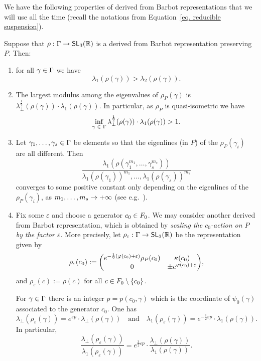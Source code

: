 \documentclass[AHL,Unicode,longabstracts]{cedram}
\DeclareMathOperator{\SL}{\mathsf{SL}}
\newcommand{\R}{\mathbb{R}}
\newcommand{\eps}{\varepsilon}
\renewcommand*{\to}{\mathchoice{\longrightarrow}{\rightarrow}{\rightarrow}{\rightarrow}}
\let\originalleft\left
\let\originalright\right
\renewcommand{\left}{\mathopen{}\mathclose\bgroup\originalleft}
\renewcommand{\right}{\aftergroup\egroup\originalright}
\let\oldin\in
\renewcommand{\in}{\mathchoice{\oldin}{\oldin}{\,\oldin\,}{\,\oldin\,}}
\begin{document}
We have the following properties of derived from Barbot representations that we will use all the time (recall the notations from Equation~\eqref{eq. reducible suspension}).

\begin{rema}\label{rem: scaling generator in P}
Suppose that $\rho:\Gamma\to\SL_3(\R)$ is a derived from Barbot representation preserving $P$. Then:
\begin{enumerate}
\item for all $\gamma\in\Gamma$ we have
\[
\lambda_{1}(\rho(\gamma))> \lambda_{2}(\rho(\gamma)).
\]
\item The largest modulus among the eigenvalues of $\rho_P(\gamma)$ is $\lambda_\perp^{\frac{1}{2}}(\rho(\gamma))\cdot\lambda_1(\rho(\gamma))$.
In particular, as $\rho_P$ is quasi-isometric we have
\[
\inf_{\gamma\in\Gamma}\lambda_\perp^{\frac{1}{2}}(\rho(\gamma))\cdot\lambda_1(\rho(\gamma))>1.
\]
\item Let $\gamma_1,\dots,\gamma_s\in\Gamma$ be elements so that the eigenlines (in $P$) of the $\rho_P(\gamma_i)$ are all different.
Then
\[
\frac{\lambda_1(\rho(\gamma_1^{m_1},\dots,\gamma_s^{m_s}))}{\lambda_1(\rho(\gamma_1))^{m_1},\dots,\lambda_1(\rho(\gamma_s))^{m_s}}
\]
converges to some positive constant only depending on the eigenlines of the $\rho_P(\gamma_i)$, as $m_1,\dots,m_s\to+\infty$ (see e.g.~\cite[Lemma~7.5]{benoistquint}).
\item Fix some $\eps$ and choose a generator $c_0\in F_0$. We may consider another derived from Barbot representation, which is obtained by \emph{scaling the $c_0$-action on $P$ by the factor $\eps$}.
More precisely, let $\rho_\eps:\Gamma\to\SL_3(\R)$ be the representation given by
\[
\rho_\eps(c_0):=\left(
\begin{matrix}
e^{-\frac{1}{2}(\varphi(c_0)+\eps)}\rho_P(c_0) & \kappa(c_0)\\
0 & \pm e^{\varphi(c_0)+\eps}
\end{matrix} \right),
\]
and $\rho_\eps(c):=\rho(c)$ for all $c\in F_0\setminus\{c_0\}$.

For $\gamma\in\Gamma$ there is an integer $p=p(c_0,\gamma)$ which is the coordinate of $\psi_0(\gamma)$ associated to the generator $c_0$.
One has
\[
\lambda_\perp(\rho_\eps(\gamma))=e^{\eps p}\cdot\lambda_\perp(\rho(\gamma)) \quad\text{and}\quad \lambda_1(\rho_\eps(\gamma))=e^{-\frac{1}{2}\eps p}\cdot\lambda_1(\rho(\gamma)).
\]
In particular,
\[
\frac{\lambda_\perp(\rho_\eps(\gamma))}{\lambda_1(\rho_\eps(\gamma))}=e^{\frac{3}{2}\eps p}\cdot \frac{\lambda_\perp(\rho(\gamma))}{\lambda_1(\rho(\gamma))}.
\]
\end{enumerate}
\end{rema}
\end{document}
